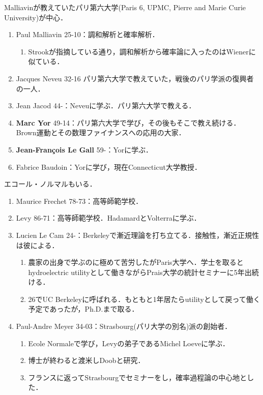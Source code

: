 \documentclass[uplatex,dvipdfmx]{jsreport}
\begin{document}
\begin{history}[France学派]
    Malliavinが教えていたパリ第六大学(Paris 6, UPMC, Pierre and Marie Curie University)が中心．
    \begin{enumerate}
        \item Paul Malliavin 25-10：調和解析と確率解析．
        \begin{enumerate}
            \item Strookが指摘している通り，調和解析から確率論に入ったのはWienerに似ている．
        \end{enumerate}
        \item Jacques Neveu 32-16 パリ第六大学で教えていた，戦後のパリ学派の復興者の一人．
        \item Jean Jacod 44-：Neveuに学ぶ．パリ第六大学で教える．
        \item \textbf{Marc Yor} 49-14：パリ第六大学で学び，その後もそこで教え続ける．
        Brown運動とその数理ファイナンスへの応用の大家．
        \item \textbf{Jean-François Le Gall} 59-：Yorに学ぶ．
        \item Fabrice Baudoin：Yorに学び，現在Connecticut大学教授．
    \end{enumerate}
    エコール・ノルマルもいる．
    \begin{enumerate}
        \item Maurice Frechet 78-73：高等師範学校．
        \item Levy 86-71：高等師範学校．HadamardとVolterraに学ぶ．
        \item Lucien Le Cam 24-：Berkeleyで漸近理論を打ち立てる．接触性，漸近正規性は彼による．
        \begin{enumerate}
            \item 農家の出身で学ぶのに極めて苦労したがParis大学へ．学士を取るとhydroelectric utilityとして働きながらPrais大学の統計セミナーに5年出続ける．
            \item 26でUC Berkeleyに呼ばれる．もともと1年居たらutilityとして戻って働く予定であったが，Ph.D.まで取る．
        \end{enumerate}
        \item Paul-Andre Meyer 34-03：Strasbourg(パリ大学の別名)派の創始者．
        \begin{enumerate}
            \item Ecole Normaleで学び，Levyの弟子であるMichel Loeveに学ぶ．
            \item 博士が終わると渡米しDoobと研究．
            \item フランスに返ってStrasbourgでセミナーをし，確率過程論の中心地とした．

\end{enumerate}
\end{enumerate}
\end{history}
\end{document}
